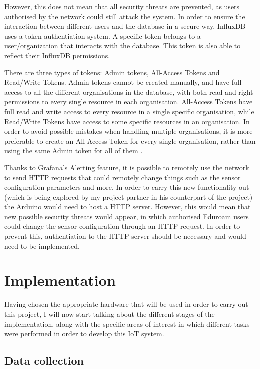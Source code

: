 \documentclass[12pt]{article}
\begin{document}
However, this does not mean that all security threats are prevented, as users authorised by the network could still attack the system. In order to ensure the interaction between different users and the database in a secure way, InfluxDB uses a token authentiation system. A specific token belongs to a user/organization that interacts with the database. This token is also able to reflect their InfluxDB permissions.\par

There are three types of tokens: Admin tokens, All-Access Tokens and Read/Write Tokens. Admin tokens cannot be created manually, and have full access to all the different organisations in the database, with both read and right permissions to every single resource in each organisation. All-Access Tokens have full read and write access to every resource in a single specific organisation, while Read/Write Tokens have access to some specific resources in an organisation. In order to avoid possible mistakes when handling multiple organisations, it is more preferable to create an All-Access Token for every single organisation, rather than using the same Admin token for all of them \cite{influx:tokens}.\par

Thanks to Grafana's Alerting feature, it is possible to remotely use the network to send HTTP requests that could remotely change things such as the sensor configuration parameters and more. In order to carry this new functionality out (which is being explored by my project partner in his counterpart of the project) the Arduino would need to host a HTTP server. However, this would mean that new possible security threats would appear, in which authorised Eduroam users could change the sensor configuration through an HTTP request. In order to prevent this, authentiation to the HTTP server should be necessary and would need to be implemented.

\section{Implementation}

Having chosen the appropriate hardware that will be used in order to carry out this project, I will now start talking about the different stages of the implementation, along with the specific areas of interest in which different tasks were performed in order to develop this IoT system. 

\subsection{Data collection}
\end{document}

